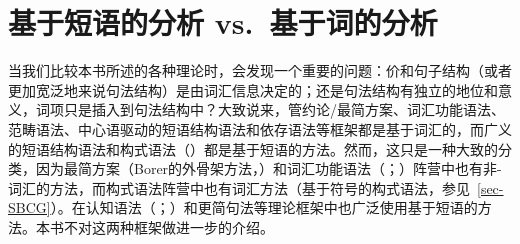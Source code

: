\chapter{基于短语的分析 vs.\ 基于词的分析}
\label{Abschnitt-Phrasal-Lexikalisch}\label{chap-phrasal}

当我们比较本书所述的各种理论时，会发现一个重要的问题：价和句子结构（或者更加宽泛地来说句法结构）是由词汇信息决定的；还是句法结构有独立的地位和意义，词项只是插入到句法结构中？大致说来，管约论/最简方案、词汇功能语法、范畴语法、中心语驱动的短语结构语法和依存语法等框架都是基于词汇的，而广义的短语结构语法和构式语法（\citealp{Goldberg95a,Goldberg2003b,Tomasello2003a,Tomasello2006c,Croft2001a}）都是基于短语的方法。然而，这只是一种大致的分类，因为最简方案（Borer的外骨架方法，\citeyear{Borer2003a-u}）和词汇功能语法（\citealp{Alsina96a}；\citealp{ADT2008a,ADT2013a}）阵营中也有非-词汇的方法，而构式语法阵营中也有词汇方法（基于符号的构式语法，参见~\ref{sec-SBCG}）。在认知语法（\citealp{Dabrowska2001a}；\citealp[]{Langacker2009a}）和更简句法\citep{CJ2005a,Jackendoff2008a}等理论框架中也广泛使用基于短语的方法。本书不对这两种框架做进一步的介绍。
